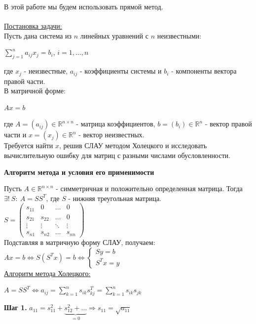 \documentclass{article}
\begin{document}
	В этой работе мы будем использовать прямой метод.\\
	\\
	\underline{Постановка задачи:}\\
	Пусть дана система из $n$ линейных уравнений с $n$ неизвестными:
	\begin{center}
		$\sum\limits_{j = 1}^n a_{ij}x_j = b_i$, $i = 1, \ldots, n$
	\end{center}
	где $x_j$ - неизвестные, $a_{ij}$ - коэффициенты системы и $b_i$ - компоненты вектора правой части.\\
	В матричной форме:
	\begin{center}
		$Ax = b$
	\end{center}
	где $A = (a_{ij}) \in \mathbb{R} ^{n \times n}$ - матрица коэффициентов, $b = (b_i) \in \mathbb{R}^n$ - вектор правой части и $x = (x_j) \in \mathbb{R}^n$ - вектор неизвестных.\\
	Требуется найти $x$, решив СЛАУ методом Холецкого и исследовать вычислительную ошибку для матриц с разными числами обусловленности.
	\begin{center} \textbf{Алгоритм метода и условия его применимости}\end{center}
	Пусть $A \in \mathbb{R}^{n \times n}$ - симметричная и положительно определенная матрица. Тогда $\exists!\ S:\ A = SS^T$, где $S$ - нижняя треугольная матрица.\\
	$S = \left(
	\begin{array}{cccc}
		s_{11} & 0 & \ldots & 0\\
		s_{21} & s_{22} & \ldots & 0\\
		\vdots & \vdots & \ddots & \vdots\\
		s_{n1} & s_{n2} & \ldots & s_{nn}
	\end{array}
	\right)$\\
	Подставляя в матричную форму СЛАУ, получаем:\\
	$Ax = b \Leftrightarrow S(S^Tx) = b \Leftrightarrow \left\{
	\begin{array}{lr}
	Sy = b\\
	S^Tx = y
	\end{array}
	\right.$
	\\
	\underline{Алгоритм метода Холецкого:}
	\begin{center}$A = SS^T \Leftrightarrow a_{ij} = \sum\limits_{k = 1}^n s_{ik}s_{kj}^T = \sum\limits_{k = 1}^n s_{ik}s_{jk}$\end{center}
	\textbf{Шаг 1.} $a_{11} = s_{11}^2 + \underbrace{s_{12}^2 + \ldots}_{=0} \Rightarrow s_{11} = \sqrt{a_{11}}$\\
\end{document}
